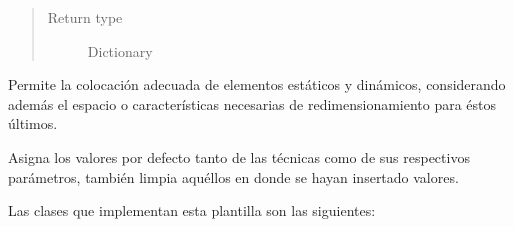 \documentclass[class=report, crop=false]{standalone}
\begin{document}
\begin{fulllineitems}
\begin{fulllineitems}
\begin{quote}
\begin{description}
\item[{Return type}] \leavevmode
Dictionary
\end{description}\end{quote}

\end{fulllineitems}

\begin{fulllineitems}

Permite la colocación adecuada de elementos estáticos y 
dinámicos, considerando además el espacio o características 
necesarias de redimensionamiento para éstos últimos.

\end{fulllineitems}

\begin{fulllineitems}

Asigna los valores por defecto tanto de las técnicas como 
de sus respectivos parámetros, también limpia aquéllos en 
donde se hayan insertado valores.

\end{fulllineitems}

\end{fulllineitems}

Las clases que implementan esta plantilla son las siguientes:
\end{document}
